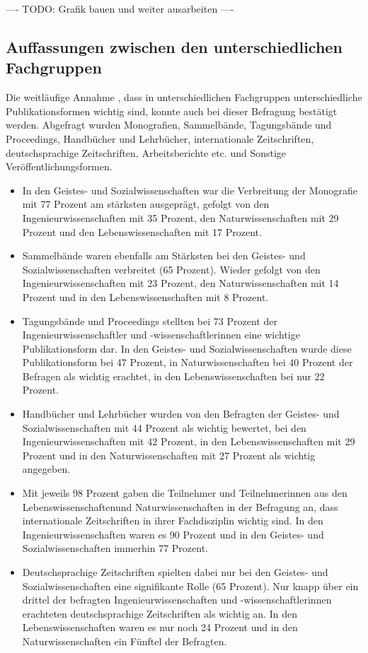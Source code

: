 ---- TODO: Grafik bauen und weiter ausarbeiten ----

\subsection{Auffassungen zwischen den unterschiedlichen Fachgruppen}

Die weitläufige Annahme \cite{naeder_2010_open}, dass in unterschiedlichen Fachgruppen unterschiedliche Publikationsformen wichtig sind, konnte auch bei dieser Befragung bestätigt werden. Abgefragt wurden Monografien, Sammelbände, Tagungsbände und Proceedings, Handbücher und Lehrbücher, internationale Zeitschriften, deutschsprachige Zeitschriften, Arbeitsberichte etc. und Sonstige Veröffentlichungsformen.

\begin{itemize}
\item In den Geistes- und Sozialwissenschaften war die Verbreitung der Monografie mit 77 Prozent am stärksten ausgeprägt, gefolgt von den Ingenieurwissenschaften mit 35 Prozent, den Naturwissenschaften mit 29 Prozent und den Lebenswissenschaften mit 17 Prozent.
\item Sammelbände waren ebenfalls am Stärksten bei den Geistes- und Sozialwissenschaften verbreitet (65 Prozent). Wieder gefolgt von den Ingenieurwissenschaften mit 23 Prozent, den Naturwissenschaften mit 14 Prozent und in den Lebenswissenschaften mit 8 Prozent.
\item Tagungsbände und Proceedings stellten bei 73 Prozent der Ingenieurwissenschaftler und -wissenschaftlerinnen eine wichtige Publikationsform dar. In den Geistes- und Sozialwissenschaften  wurde diese Publikationsform bei 47 Prozent, in Naturwissenschaften bei 40 Prozent der Befragen als wichtig erachtet, in den Lebenswissenschaften bei nur 22 Prozent.
\item Handbücher und Lehrbücher wurden von den Befragten der Geistes- und Sozialwissenschaften mit 44 Prozent als wichtig bewertet, bei den Ingenieurwissenschaften mit 42 Prozent, in den Lebenswissenschaften mit 29 Prozent und in den Naturwissenschaften mit 27 Prozent als wichtig angegeben.
\item Mit jeweils 98 Prozent gaben die Teilnehmer und Teilnehmerinnen aus den Lebenswissenschaftenund Naturwissenschaften in der Befragung an, dass internationale Zeitschriften in ihrer Fachdisziplin wichtig sind. In den Ingenieurwissenschaften waren es 90 Prozent und in den Geistes- und Sozialwissenschaften immerhin 77 Prozent.
\item Deutschsprachige Zeitschriften spielten dabei nur bei den Geistes- und Sozialwissenschaften eine signifikante Rolle (65 Prozent). Nur knapp über ein drittel der befragten Ingenieurwissenschaften und -wissenschaftlerinnen erachteten deutschsprachige Zeitschriften als wichtig an. In den Lebenswissenschaften waren es nur noch 24 Prozent und in den Naturwissenschaften ein Fünftel der Befragten.

\end{itemize}
